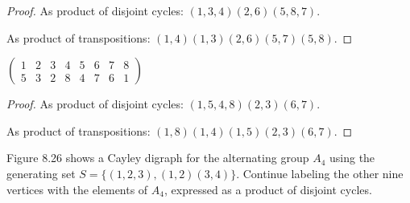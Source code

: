\begin{proof}
    As product of disjoint cycles: $(1, 3, 4)(2, 6)(5, 8, 7)$.

    As product of transpositions: $(1, 4)(1, 3)(2, 6)(5, 7)(5, 8)$.
\end{proof}

\newpage
\begin{exercise}
    $\begin{pmatrix}
            1 & 2 & 3 & 4 & 5 & 6 & 7 & 8 \\
            5 & 3 & 2 & 8 & 4 & 7 & 6 & 1
        \end{pmatrix}$
\end{exercise}

\begin{proof}
    As product of disjoint cycles: $(1, 5, 4, 8)(2, 3)(6, 7)$.

    As product of transpositions: $(1, 8)(1, 4)(1, 5)(2, 3)(6, 7)$.
\end{proof}

\newpage
\begin{exercise}
    Figure 8.26 shows a Cayley digraph for the alternating group $A_{4}$ using the generating set $S = \{ (1, 2, 3), (1, 2)(3, 4) \}$. Continue labeling the other nine vertices with the elements of $A_{4}$, expressed as a product of disjoint cycles.
\end{exercise}

